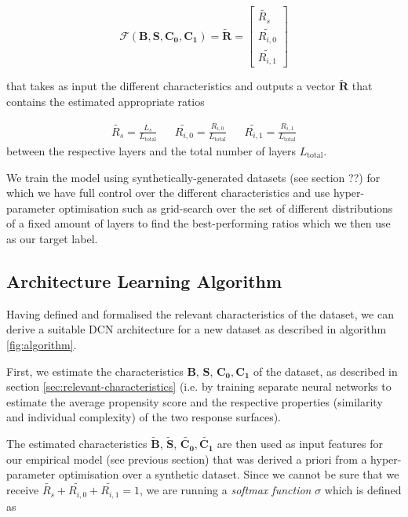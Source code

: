 \begin{equation}
\mathcal{F}(\mathbf{B}, \mathbf{S}, \mathbf{C_0}, \mathbf{C_1}) = \tilde{\mathbf{R}} = \begin{bmatrix}
\tilde{R_{s}} \\
\tilde{R_{i,0}} \\
\tilde{R_{i,1}}
\end{bmatrix} 
\end{equation}

that takes as input the different characteristics and outputs a vector $\tilde{\mathbf{R}}$ that contains the estimated appropriate ratios 

\begin{align} 
\tilde{R_{s}} = \frac{L_{s}}{L_{\text{total}}} && \tilde{R_{i,0}} = \frac{R_{i,0}}{L_{\text{total}}} && \tilde{R_{i,1}} =\frac{R_{i,1}}{L_{\text{total}}}
\end{align} 
between the respective layers and the total number of layers $L_{\text{total}}$. 

We train the model using  synthetically-generated datasets (see section ??) %
for which we have full control over the different characteristics and use hyper-parameter optimisation such as grid-search over the set of different distributions of a fixed amount of layers to find the best-performing ratios which we then use as our target label. 


\subsection{Architecture Learning Algorithm}
Having defined and formalised the relevant characteristics of the dataset, we can derive a suitable DCN architecture for a new dataset as described in algorithm \ref{fig:algorithm}. 

First, we estimate the characteristics $\mathbf{B}$, $\mathbf{S}$, $\mathbf{C_0}, \mathbf{C_1}$ of the dataset, as described in section  \ref{sec:relevant-characteristics} (i.e. by training separate neural networks to estimate the average propensity score and the respective properties (similarity and individual complexity) of the two response surfaces). 

The estimated characteristics $\tilde{\mathbf{B}}$, $\tilde{\mathbf{S}}$, $\tilde{\mathbf{C_0}}, \tilde{\mathbf{C_1}}$ are then used as input features for our empirical model (see previous section) that was derived a priori from a hyper-parameter optimisation over a synthetic dataset. Since we cannot be sure that we receive $\tilde{R_{s}} + \tilde{R_{i,0}} + \tilde{R_{i,1}} = 1 $, we are running a \emph{softmax function} $\sigma$ which is defined as  

